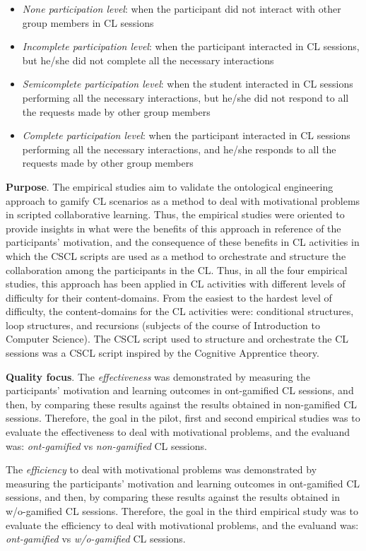 \begin{itemize}
\item \emph{None participation level}: when the participant did not interact with other group members in CL sessions
\item \emph{Incomplete participation level}: when the participant interacted in CL sessions, but he/she did not complete all the necessary interactions
\item \emph{Semicomplete participation level}: when the student interacted in CL sessions performing all the necessary interactions, but he/she did not respond to all the requests made by other group members
\item \emph{Complete participation level}: when the participant interacted in CL sessions performing all the necessary interactions, and he/she responds to all the requests made by other group members
\end{itemize}
 
\textbf{Purpose}.
The empirical studies aim to validate the ontological engineering approach to gamify CL scenarios as a method to deal with motivational problems in scripted collaborative learning. 
Thus, the empirical studies were oriented to provide insights in what were the benefits of this approach in reference of the participants' motivation, and the consequence of these benefits in CL activities in which the CSCL scripts are used as a method to orchestrate and structure the collaboration among the participants in the CL.
Thus, in all the four empirical studies, this approach has been applied in CL activities with different levels of difficulty for their content-domains.
From the easiest to the hardest level of difficulty, the content-domains for the CL activities were: conditional structures, loop structures, and recursions (subjects of the course of Introduction to Computer Science).
The CSCL script used to structure and orchestrate the CL sessions was a CSCL script inspired by the Cognitive Apprentice theory.

\textbf{Quality focus}.
The \emph{effectiveness} was demonstrated by measuring the participants' motivation and learning outcomes in ont-gamified CL sessions, and then, by comparing these results against the results obtained in non-gamified CL sessions.
Therefore, the goal in the pilot, first and second empirical studies was to evaluate the effectiveness to deal with motivational problems, and the evaluand was: \emph{ont-gamified} vs \emph{non-gamified} CL sessions.

The \emph{efficiency} to deal with motivational problems was demonstrated by measuring the participants' motivation and learning outcomes in ont-gamified CL sessions, and then, by comparing these results against the results obtained in w/o-gamified CL sessions.
Therefore, the goal in the third empirical study was to evaluate the efficiency to deal with motivational problems, and the evaluand was: \emph{ont-gamified} vs \emph{w/o-gamified} CL sessions.

